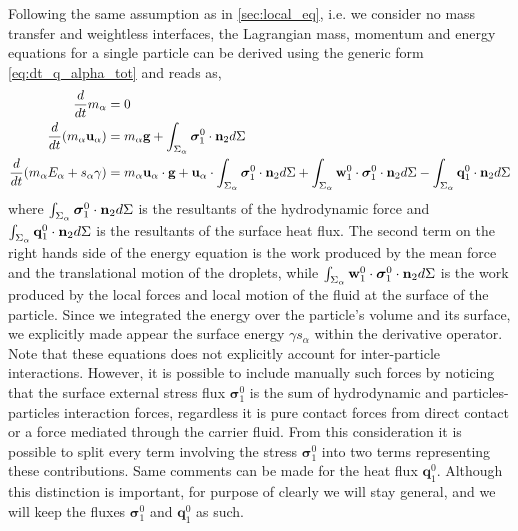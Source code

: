 Following the same assumption as in \ref{sec:local_eq}, i.e. we consider no mass transfer and weightless interfaces, the Lagrangian  mass, momentum and energy equations for a single particle can be derived using the generic form \ref{eq:dt_q_alpha_tot} and reads as, 
\begin{align}
    \label{eq:dt_m_alpha}
    \frac{d}{d t} m_\alpha
    &= 
    0\\
    \label{eq:dt_p_alpha}
    \frac{d}{d t} (m_\alpha \textbf{u}_\alpha)
    &= 
    m_\alpha\textbf{g}
    +  \int_{\Sigma_\alpha} \bm{\sigma}_1^0 \cdot \textbf{n}_2 d\Sigma\\
    \label{eq:dt_E_alpha}
    \frac{d}{d t} (m_\alpha E_\alpha + s_\alpha \gamma)
    &= 
    m_\alpha \textbf{u}_\alpha \cdot \textbf{g}
    +\textbf{u}_\alpha \cdot \int_{\Sigma_\alpha} \bm{\sigma}_1^0 \cdot \textbf{n}_2 d\Sigma
    +\int_{\Sigma_\alpha} \textbf{w}_1^0 \cdot \bm{\sigma}_1^0 \cdot  \textbf{n}_2 d\Sigma 
    - \int_{\Sigma_\alpha} \textbf{q}_1^0 \cdot \textbf{n}_2 d\Sigma
\end{align}
where  $\int_{\Sigma_\alpha}   \bm{\sigma}_1^0 \cdot \textbf{n}_2  d\Sigma$ is the resultants of the hydrodynamic force and $\int_{\Sigma_\alpha}  \textbf{q}_1^0 \cdot \textbf{n}_2  d\Sigma$ is the resultants of the surface heat flux. 
The second term on the right hands side of the energy equation is the work produced by the mean force and the translational motion of the droplets, while $\int_{\Sigma_\alpha} \textbf{w}_1^0 \cdot \bm{\sigma}_1^0 \cdot  \textbf{n}_2 d\Sigma$ is the work produced by the local forces and local motion of the fluid at the surface of the particle.
Since we integrated the energy over the particle's volume and its surface, we explicitly made appear the surface energy $\gamma s_\alpha$ within the derivative operator. 
Note that these equations does not explicitly account for inter-particle interactions. 
However, it is possible to include manually such forces by noticing that the surface external stress flux $\bm{\sigma}_1^0$ is the sum of hydrodynamic and particles-particles interaction forces, regardless it is pure contact forces from direct contact or a force mediated through the carrier fluid.
From this consideration it is possible to split every term involving the stress $\bm{\sigma}_1^0$ into two terms representing these contributions. 
Same comments can be made for the heat flux $\textbf{q}_1^0$. 
Although this distinction is important, for purpose of clearly we will stay general, and we will keep the fluxes $\bm{\sigma}_1^0$ and $\textbf{q}_1^0$ as such. 

